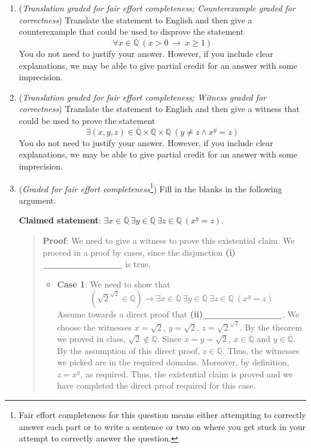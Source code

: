 \documentclass[12pt, oneside]{article}
\begin{document}
\begin{enumerate}
\begin{enumerate}
        \item ({\it Translation graded for fair effort completeness; Counterexample graded 
        for correctness}) Translate the statement to English and then give a counterexample 
        that could be used to disprove the statement
        \[
        \forall x \in \overline{\mathbb{Q}} ~\left(  x > 0 ~\to~ x \geq 1 \right)
        \]
        You do not need to justify your answer.  However, if you include clear explanations, 
        we may be able to give partial credit for an answer with some imprecision.
   
        \item ({\it Translation graded for fair effort completeness; Witness graded 
        for correctness}) Translate the statement to English and then give a witness that 
        could be used to prove the statement 
        \[
        \exists (x,y,z) \in \overline{\mathbb{Q}}\times\mathbb{Q}\times \mathbb{Q} ~(y \neq z \land x^ y= z)
        \]
        You do not need to justify your answer.  However, if you include clear explanations, 
        we may be able to give partial credit for an answer with some imprecision.
   
        \item ({\it Graded for fair effort completeness}\footnote{Fair effort completeness
        for this question means either attempting to correctly answer each part
        or to write a sentence or two on where you get stuck in your attempt to correctly answer
        the question.}) Fill in the blanks in the following argument.

        {\bf Claimed statement}: 
        $\exists x \in \overline{\mathbb{Q}}~ \exists y \in \overline{\mathbb{Q}} 
        ~\exists z\in \mathbb{Q} ~(x^y = z)$.
        
        \begin{quote}
        {\bf Proof}: We need to give a witness to prove this existential claim. 
        We proceed in a proof by cases, since the disjunction
        \textbf{(i)}$\underline{\phantom{\hspace{1.3in}}}$ is true.
        \begin{itemize}
        \item {\bf Case 1}: We need to show that 
        \[
            (\sqrt{2}^{\sqrt{2}} \in \mathbb{Q}) \to 
            \exists x \in \overline{\mathbb{Q}}~ \exists y \in \overline{\mathbb{Q}} 
            ~\exists z\in \mathbb{Q} ~(x^y = z)
        \]
        Assume towards a direct proof that \textbf{(ii)}$\underline{\phantom{\hspace{1.3in}}}$. We
        choose the witnesses $x = \sqrt{2}$, $y = \sqrt{2}$, $z = \sqrt{2}^{\sqrt{2}}$.  By the 
        theorem we proved in class, $\sqrt{2} \notin \mathbb{Q}$.
        Since $x = y = \sqrt{2}$, $x \in \overline{\mathbb{Q}}$ and  $y \in \overline{\mathbb{Q}}$.
        By the assumption of this direct proof, $z \in \mathbb{Q}$. Thus, the witnesses we picked
        are in the required domains.  Moreover, by definition, $z = x^y$, as required. Thus, the existential claim
        is proved and we have completed the direct proof required for this case.
   

\end{itemize}
\end{quote}
\end{enumerate}
\end{enumerate}
\end{document}
